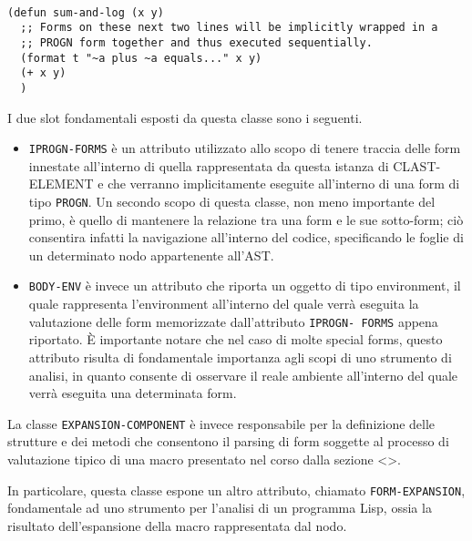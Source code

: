 \begin{lstlisting}[caption=Esempio di costrutto che fa utilizzo di del
costrutto PROGN in modo implicito]

(defun sum-and-log (x y)
  ;; Forms on these next two lines will be implicitly wrapped in a
  ;; PROGN form together and thus executed sequentially.
  (format t "~a plus ~a equals..." x y)
  (+ x y)
  )

\end{lstlisting}

I due slot fondamentali esposti da questa classe sono i seguenti.\\

\begin{itemize}

\item \texttt{IPROGN-FORMS} è un attributo utilizzato allo scopo di tenere
traccia delle form innestate all’interno di quella rappresentata da questa
istanza di CLAST-ELEMENT e che verranno implicitamente eseguite all’interno di
una form di tipo \texttt{PROGN}. Un secondo scopo di questa classe, non meno
importante del primo, è quello di mantenere la relazione tra una form e le sue
sotto-form; ciò consentira infatti la navigazione all'interno del codice,
specificando le foglie di un determinato nodo appartenente all'AST.

\item \texttt{BODY-ENV} è invece un attributo che riporta un oggetto di tipo
environment, il quale rappresenta l’environment all’interno del quale verrà
eseguita la valutazione delle form memorizzate dall’attributo \texttt{IPROGN-
FORMS} appena riportato. È importante notare che nel caso di molte special
forms, questo attributo risulta di fondamentale importanza agli scopi di uno
strumento di analisi, in quanto consente di osservare il reale ambiente
all'interno del quale verrà eseguita una determinata form.

\end{itemize}

La classe \texttt{EXPANSION-COMPONENT} è invece responsabile per la
definizione delle strutture e dei metodi che consentono il parsing di form
soggette al processo di valutazione tipico di una macro presentato nel corso
dalla sezione <>.

In particolare, questa classe espone un altro attributo, chiamato \texttt
{FORM-EXPANSION}, fondamentale ad uno strumento per l’analisi di un programma
Lisp, ossia la risultato dell’espansione della macro rappresentata dal nodo.\\

